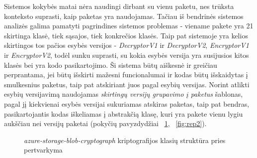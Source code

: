 Sistemos kokybės matai nėra naudingi dirbant su vienu paketu, nes trūksta konteksto suprasti, kaip paketas yra naudojamas.
Tačiau iš bendrinės sistemos analizės galima pamatyti pagrindines sistemos problemas - viename pakete yra 21 skirtinga klasė, tiek sąsajos, tiek konkrečios klasės.
Taip pat sistemoje yra kelios skirtingos tos pačios esybės versijos - \textit{DecryptorV1} ir \textit{DecryptorV2}, \textit{EncryptorV1} ir \textit{EncryptorV2}, todėl sunku
suprasti, su kokia esybės versija yra susijusios kitos klasės bei yra kodo pasikartojimo.
Ši sistema būtų aiškesnė ir greičiau perprantama, jei būtų išskirti mažesni funcionalumai ir kodas būtų išskaidytas į smulkesnius paketus, taip pat atskiriant juos
pagal esybių versijas.
Norint atlikti esybių versijavimą naudojamas \textit{skirtingų versijų grupavimo į paketus} šablonas, pagal jį kiekvienai esybės versijai sukuriamas atskiras paketas,
taip pat bendras, pasikartojantis kodas iškeliamas į abstrakčią klasę, kuri yra pakete vienu lygiu aukščiau nei versijų paketai (pokyčių pavyzdydžiai ~\ref{fig:rep1}, ~\ref{fig:rep2}).

\begin{figure}[H]
    \snugshade
    \endsnugshade
    \caption{\textit{azure-storage-blob-cryptograph} kriptografijos klasių struktūra pries pertvarkyma}
    \label{fig:rep1}
\end{figure}

